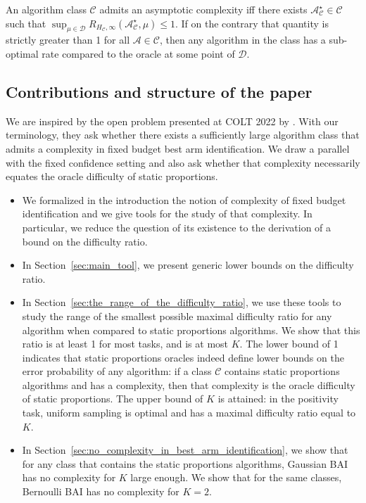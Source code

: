\documentclass{article}
\begin{document}
An algorithm class $\mathcal C$ admits an asymptotic complexity iff there exists $\mathcal A^\star_{\mathcal C} \in \mathcal C$ such that $\sup_{\mu \in \mathcal D} R_{H_{\mathcal C}, \infty}(\mathcal A^\star_{\mathcal C}, \mu) \le 1$. If on the contrary that quantity is strictly greater than 1 for all $\mathcal A \in \mathcal C$, then any algorithm in the class has a sub-optimal rate compared to the oracle at some point of $\mathcal D$.

\subsection{Contributions and structure of the paper}
\label{sub:contributions}

We are inspired by the open problem presented at COLT 2022 by \cite{qin2022open}. With our terminology, they ask whether there exists a sufficiently large algorithm class that admits a complexity in fixed budget best arm identification. We draw a parallel with the fixed confidence setting and also ask whether that complexity necessarily equates the oracle difficulty of static proportions.
\begin{itemize}
	\item We formalized in the introduction the notion of complexity of fixed budget identification and we give tools for the study of that complexity. In particular, we reduce the question of its existence to the derivation of a bound on the difficulty ratio.
	\item In Section~\ref{sec:main_tool}, we present generic lower bounds on the difficulty ratio.
	\item In Section~\ref{sec:the_range_of_the_difficulty_ratio}, we use these tools to study the range of the smallest possible maximal difficulty ratio for any algorithm when compared to static proportions algorithms. We show that this ratio is at least 1 for most tasks, and is at most $K$. The lower bound of 1 indicates that static proportions oracles indeed define lower bounds on the error probability of any algorithm: if a class $\mathcal C$ contains static proportions algorithms and has a complexity, then that complexity is the oracle difficulty of static proportions. The upper bound of $K$ is attained: in the positivity task, uniform sampling is optimal and has a maximal difficulty ratio equal to $K$. 
	\item In Section~\ref{sec:no_complexity_in_best_arm_identification}, we show that for any class that contains the static proportions algorithms, Gaussian BAI has no complexity for $K$ large enough. We show that for the same classes, Bernoulli BAI has no complexity for $K=2$.
\end{itemize}
\end{document}

